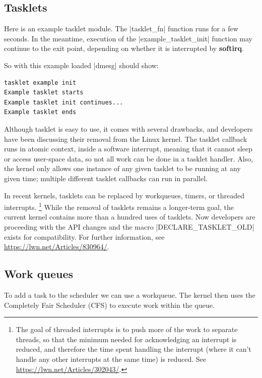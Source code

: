 \documentclass[10pt, oneside]{book}
\begin{document}
\subsection{Tasklets}
\label{sec:tasklet}
Here is an example tasklet module.
The \cpp|tasklet_fn| function runs for a few seconds.
In the meantime, execution of the \cpp|example_tasklet_init| function may continue to the exit point,
depending on whether it is interrupted by \textbf{softirq}.


So with this example loaded \sh|dmesg| should show:

\begin{verbatim}
tasklet example init
Example tasklet starts
Example tasklet init continues...
Example tasklet ends
\end{verbatim}
Although tasklet is easy to use, it comes with several drawbacks, and developers have been discussing their removal from the Linux kernel.
The tasklet callback runs in atomic context, inside a software interrupt, meaning that it cannot sleep or access user-space data, so not all work can be done in a tasklet handler.
Also, the kernel only allows one instance of any given tasklet to be running at any given time; multiple different tasklet callbacks can run in parallel.

In recent kernels, tasklets can be replaced by workqueues, timers, or threaded interrupts.
\footnote{
The goal of threaded interrupts is to push more of the work to separate threads,
so that the minimum needed for acknowledging an interrupt is reduced,
and therefore the time spent handling the interrupt (where it can't handle any other interrupts at the same time) is reduced.
See \url{https://lwn.net/Articles/302043/}.
}
While the removal of tasklets remains a longer-term goal, the current kernel contains more than a hundred uses of tasklets.
Now developers are proceeding with the API changes and the macro \cpp|DECLARE_TASKLET_OLD| exists for compatibility.
For further information, see \url{https://lwn.net/Articles/830964/}.

\subsection{Work queues}
\label{sec:workqueue}
To add a task to the scheduler we can use a workqueue.
The kernel then uses the Completely Fair Scheduler (CFS) to execute work within the queue.

\end{document}
